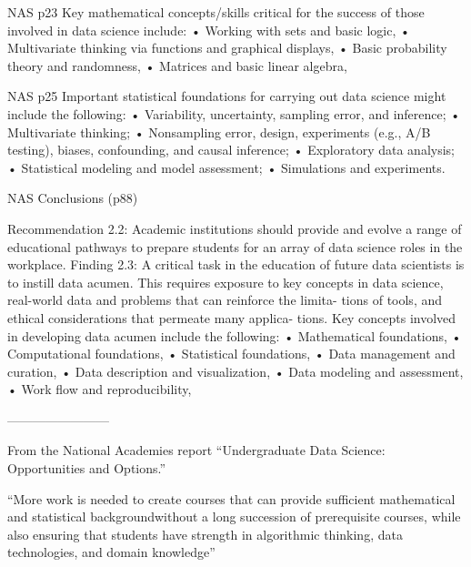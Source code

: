 \documentclass{beamer}
\begin{document}
NAS p23
Key mathematical concepts/skills critical for the success of those involved in data science include:
• Working with sets and basic logic,
• Multivariate thinking via functions and graphical displays,
• Basic probability theory and randomness,
• Matrices and basic linear algebra,

NAS p25
Important statistical foundations for carrying out data science might include the following:
• Variability, uncertainty, sampling error, and inference;
• Multivariate thinking;
• Nonsampling error, design, experiments (e.g., A/B testing), biases, confounding, and causal inference;
• Exploratory data analysis;
• Statistical modeling and model assessment;
• Simulations and experiments.

NAS Conclusions (p88)

Recommendation 2.2: Academic institutions should provide and evolve a range of educational pathways to prepare students for an array of data science roles in the workplace.
Finding 2.3: A critical task in the education of future data scientists is to instill data acumen. This requires exposure to key concepts in data science, real-world data and problems that can reinforce the limita- tions of tools, and ethical considerations that permeate many applica- tions. Key concepts involved in developing data acumen include the following:
• Mathematical foundations,
• Computational foundations,
• Statistical foundations,
• Data management and curation,
• Data description and visualization,
• Data modeling and assessment,
• Work flow and reproducibility,


------------------------



From the National Academies report ``Undergraduate Data Science: Opportunities and Options.''

``More work is needed to create courses that can provide sufficient mathematical and statistical backgroundwithout a long succession of prerequisite courses, while also ensuring that students have strength in algorithmic thinking, data technologies, and domain knowledge''
\end{document}
